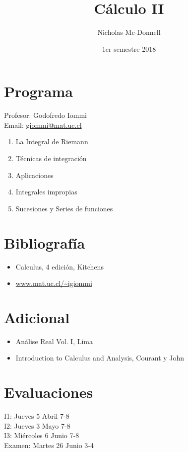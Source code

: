 \documentclass[11pt]{book}
\title{Cálculo II}
\author{Nicholas Mc-Donnell}
\date{1er semestre 2018}
\begin{document}
\maketitle

\newpage
\section*{Programa}
{\raggedleft Profesor: Godofredo Iommi}\\
Email: \url{giommi@mat.uc.cl}
\begin{enumerate}
	\item La Integral de Riemann

	\item Técnicas de integración

	\item Aplicaciones

	\item Integrales impropias

	\item Sucesiones y Series de funciones
\end{enumerate}

\section*{Bibliografía}
\begin{itemize}
	\item Calculus, 4 edición, Kitchens

	\item \url{www.mat.uc.cl/~igiommi}

\end{itemize}

\section*{Adicional}
\begin{itemize}
	\item Análise Real Vol. I, Lima

	\item Introduction to Calculus and Analysis, Courant y John
\end{itemize}

\section*{Evaluaciones}
I1: Jueves 5 Abril 7-8\\
I2: Jueves 3 Mayo 7-8\\
I3: Miércoles 6 Junio 7-8\\
Examen: Martes 26 Junio 3-4\\
\end{document}
